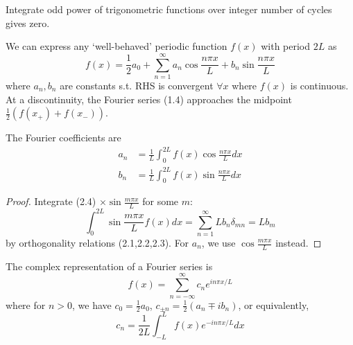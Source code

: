 \documentclass[a4paper]{article}
\begin{document}
\begin{cor}
Integrate odd power of trigonometric functions over integer number of cycles gives zero.
\end{cor}
\begin{defi}
We can express any `well-behaved' periodic function $f(x)$ with period $2L$ as
\begin{equation}
    f(x)=\frac{1}{2}a_0+\sum_{n=1}^\infty a_n\cos\frac{n\pi x}{L}+b_n\sin\frac{n\pi x}{L}\tag{2.4}
\end{equation}
where $a_n,b_n$ are constants s.t. RHS is convergent $\forall x$ where $f(x)$ is continuous. At a discontinuity, the Fourier series (1.4) approaches the midpoint $\frac{1}{2}(f(x_+)+f(x_-))$.
\end{defi}
\begin{prop}
The Fourier coefficients are
\begin{align}
a_n&=\frac{1}{L}\int_0^{2L}f(x)\cos\frac{n\pi x}{L}dx\tag{2.5a}\\
b_n&=\frac{1}{L}\int_0^{2L}f(x)\sin\frac{n\pi x}{L}dx\tag{2.5b}
\end{align}
\end{prop}
\begin{proof}
Integrate (2.4) $\times\sin\frac{m\pi x}{L}$ for some $m$:
$$\int_0^{2L}\sin\frac{m\pi x}{L}f(x)dx=\sum_{n=1}^\infty Lb_n\delta_{mn}=Lb_m$$
by orthogonality relations (2.1,2.2,2.3). For $a_n$, we use $\cos\frac{m\pi x}{L}$ instead.
\end{proof}
\begin{prop}
The complex representation of a Fourier series is
\begin{equation}
f(x)=\sum_{n=-\infty}^\infty c_ne^{in\pi x/L}\tag{2.6a}
\end{equation}
where for $n>0$, we have $c_0=\frac{1}{2}a_0$, $c_{\pm n}=\frac{1}{2}(a_n\mp ib_n)$, or equivalently,
\begin{equation}
    c_n=\frac{1}{2L}\int_{-L}^Lf(x)e^{-in\pi x/L}dx\tag{2.6b}
\end{equation}
\end{prop}
\end{document}
